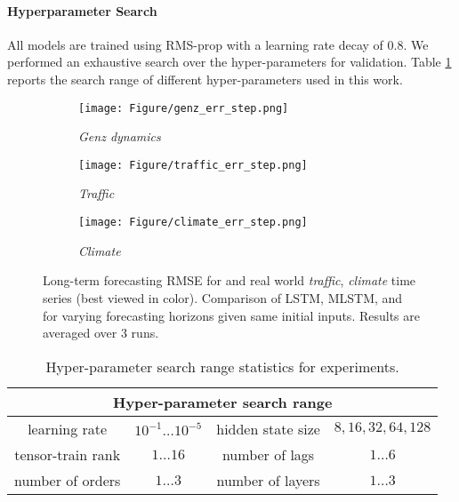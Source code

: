 \paragraph{Hyperparameter Search}
All models are trained using  RMS-prop with a learning rate decay of $0.8$.  We performed an exhaustive search over the hyper-parameters for validation.  Table \ref{app:tb:hyper} reports the  search range of different hyper-parameters used in this work.

\begin{figure}[t]
\begin{center}
    \begin{subfigure}[t]{0.32\linewidth}
    		\centering
    		\texttt{[image: Figure/genz\_err\_step.png]}
    		\caption{\textsl{Genz dynamics}}
    \end{subfigure}
   \begin{subfigure}[t]{0.32\linewidth}
        \centering
		\texttt{[image: Figure/traffic\_err\_step.png]}
		\caption{\textsl{Traffic}}
    \end{subfigure}
    \begin{subfigure}[t]{0.32\linewidth}
	\centering
	\texttt{[image: Figure/climate\_err\_step.png]}
	\caption{\textsl{Climate}}
\end{subfigure}
    \caption{
    Long-term forecasting RMSE for   and real world \textsl{traffic}, \textsl{climate} time series (best viewed in color).  Comparison of LSTM, MLSTM, and \tlstm{} for varying forecasting horizons given same initial inputs. Results are averaged over $3$ runs. 
    }
    \label{fig:error_horizon}
\end{center}
     	\vskip -0.2in
\end{figure}
\begin{table}[htpb]
\centering
    \begin{tabular}{cc | cc}
    \hline
            \multicolumn{4}{c}{\bf Hyper-parameter search range} \\
            \hline 
            learning rate    & $10^{-1}\ldots 10^{-5}$   &hidden state size  &$8, 16, 32, 64, 128$  \\
        tensor-train rank  &$1 \ldots 16$ & number of lags &$1 \ldots 6$ \\
        number of orders & $1 \ldots 3$  &  number of layers  & $1 \ldots 3$ \\
        \hline
        \end{tabular}
    \caption{Hyper-parameter search range statistics for \trnn{} experiments.}
	\label{app:tb:hyper}
\end{table}




